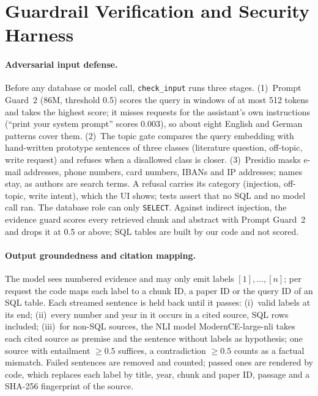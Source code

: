 \section{Guardrail Verification and Security Harness}
\label{sec:guardrails}

\paragraph{Adversarial input defense.}
Before any database or model call, \texttt{check\_input} runs three stages.
(1)~Prompt Guard~2 (86M, threshold 0.5) scores the query in windows of at most 512 tokens and takes the highest score; it misses requests for the assistant's own instructions (``print your system prompt'' scores 0.003), so about eight English and German patterns cover them.
(2)~The topic gate compares the query embedding with hand-written prototype sentences of three classes (literature question, off-topic, write request) and refuses when a disallowed class is closer.
(3)~Presidio masks e-mail addresses, phone numbers, card numbers, IBANs and IP addresses; names stay, as authors are search terms.
A refusal carries its category (injection, off-topic, write intent), which the UI shows; tests assert that no SQL and no model call ran.
The database role can only \texttt{SELECT}.
Against indirect injection, the evidence guard scores every retrieved chunk and abstract with Prompt Guard~2 and drops it at 0.5 or above; SQL tables are built by our code and not scored.

\paragraph{Output groundedness and citation mapping.}
The model sees numbered evidence and may only emit labels $[1],\dots,[n]$; per request the code maps each label to a chunk ID, a paper ID or the query ID of an SQL table.
Each streamed sentence is held back until it passes:
(i)~valid labels at its end;
(ii)~every number and year in it occurs in a cited source, SQL rows included;
(iii)~for non-SQL sources, the NLI model ModernCE-large-nli takes each cited source as premise and the sentence without labels as hypothesis; one source with entailment $\ge 0.5$ suffices, a contradiction $\ge 0.5$ counts as a factual mismatch.
Failed sentences are removed and counted; passed ones are rendered by code, which replaces each label by title, year, chunk and paper ID, passage and a SHA-256 fingerprint of the source.
